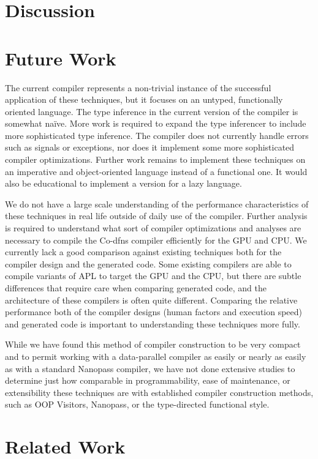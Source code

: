 ﻿\documentclass[numbers,10pt,preprint]{sigplanconf}
\begin{document}
\section{Discussion}

\section{Future Work}

The current compiler represents a non-trivial instance of the successful application of these techniques, but it focuses on an untyped, functionally oriented language. The type inference in the current version of the compiler is somewhat na\"ive. More work is required to expand the type inferencer to include more sophisticated type inference. The compiler does not currently handle errors such as signals or exceptions, nor does it implement some more sophisticated compiler optimizations. Further work remains to implement these techniques on an imperative and object-oriented language instead of a functional one. It would also be educational to implement a version for a lazy language.

We do not have a large scale understanding of the performance characteristics of these techniques in real life outside of daily use of the compiler. Further analysis is required to understand what sort of compiler optimizations and analyses are necessary to compile the Co-dfns compiler efficiently for the GPU and CPU. We currently lack a good comparison against existing techniques both for the compiler design and the generated code. Some existing compilers are able to compile variants of APL to target the GPU and the CPU, but there are subtle differences that require care when comparing generated code, and the architecture of these compilers is often quite different. Comparing the relative performance both of the compiler designs (human factors and execution speed) and generated code is important to understanding these techniques more fully.

While we have found this method of compiler construction to be very compact and to permit working with a data-parallel compiler as easily or nearly as easily as with a standard Nanopass compiler, we have not done extensive studies to determine just how comparable in programmability, ease of maintenance, or extensibility these techniques are with established compiler construction methods, such as OOP Visitors, Nanopass, or the type-directed functional style.

\section{Related Work}
\end{document}
